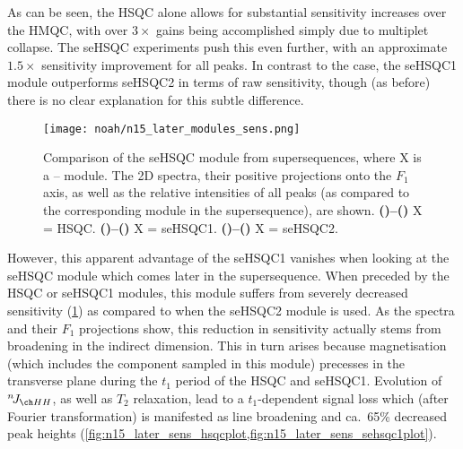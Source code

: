 As can be seen, the HSQC alone allows for substantial sensitivity increases over the HMQC, with over $3\times$ gains being accomplished simply due to multiplet collapse.
The seHSQC experiments push this even further, with an approximate $1.5\times$ sensitivity improvement for all peaks.
In contrast to the \carbon{} case, the \nitrogen{} seHSQC1 module outperforms seHSQC2 in terms of raw sensitivity, though (as before) there is no clear explanation for this subtle difference.

\begin{figure}[!ht]
    \centering
    \texttt{[image: noah/n15\_later\_modules\_sens.png]}%
    {\label{fig:n15_later_sens_hsqc}}%
    {\label{fig:n15_later_sens_hsqcp}}%
    {\label{fig:n15_later_sens_hsqcplot}}%
    {\label{fig:n15_later_sens_sehsqc1}}%
    {\label{fig:n15_later_sens_sehsqc1p}}%
    {\label{fig:n15_later_sens_sehsqc1plot}}%
    {\label{fig:n15_later_sens_sehsqc2}}%
    {\label{fig:n15_later_sens_sehsqc2p}}%
    {\label{fig:n15_later_sens_sehsqc2plot}}%
    \caption[Comparison of \carbon{} seHSQC sensitivity when preceded by different \nitrogen{} modules]{
        Comparison of the \carbon{} seHSQC module from  supersequences, where X is a \proton{}--\nitrogen{} module.
        The 2D spectra, their positive projections onto the $F_1$ axis, as well as the relative intensities of all peaks (as compared to the corresponding module in the  supersequence), are shown.
        \textbf{()--()} X = \nitrogen{} HSQC.
        \textbf{()--()} X = \nitrogen{} seHSQC1.
        \textbf{()--()} X = \nitrogen{} seHSQC2.
    }
    \label{fig:n15_later_sens}
\end{figure}

However, this apparent advantage of the seHSQC1 vanishes when looking at the \carbon{} seHSQC module which comes later in the supersequence.
When preceded by the \nitrogen{} HSQC or seHSQC1 modules, this module suffers from severely decreased sensitivity (\cref{fig:n15_later_sens}) as compared to when the seHSQC2 module is used.
As the spectra and their $F_1$ projections show, this reduction in sensitivity actually stems from broadening in the indirect dimension.
This in turn arises because  magnetisation (which includes the  component sampled in this module) precesses in the transverse plane during the $t_1$ period of the \nitrogen{} HSQC and seHSQC1.
Evolution of $\nJ{HH}$, as well as $T_2$ relaxation, lead to a $t_1$-dependent signal loss which (after Fourier transformation) is manifested as line broadening and ca.\ 65\% decreased peak heights (\cref{fig:n15_later_sens_hsqcplot,fig:n15_later_sens_sehsqc1plot}).


